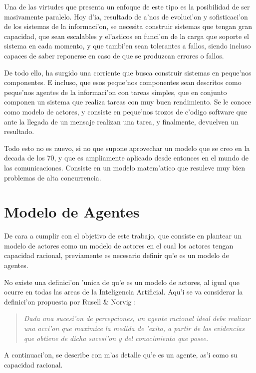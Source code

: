 \documentclass[12pt]{article}
\begin{document}
Una de las virtudes que presenta un enfoque de este tipo es la posibilidad de ser masivamente
paralelo. Hoy d'ia, resultado de a'nos de evoluci'on y sofisticaci'on de los sistemas de la informaci'on,
se necesita construir sistemas que tengan gran capacidad, que sean escalables y el'asticos
en funci'on de la carga que soporte el sistema en cada momento, y que tambi'en sean tolerantes
a fallos, siendo incluso capaces de saber reponerse en caso de que se produzcan errores o fallos.

De todo ello, ha surgido una corriente que busca construir sistemas en peque'nos componentes. E incluso,
que esos peque'nos componentes sean descritos como peque'nos agentes de la informaci'on con tareas simples,
que en conjunto componen un sistema que realiza tareas con muy buen rendimiento. Se le conoce como modelo de
actores, y consiste en peque'nos trozos de c'odigo software que ante la llegada de un mensaje realizan
una tarea, y finalmente, devuelven un resultado.

Todo esto no es nuevo, si no que supone aprovechar un modelo que se creo en la decada de los 70, y
que es ampliamente aplicado desde entonces en el mundo de las comunicaciones. Consiste en un
modelo matem'atico que resuleve muy bien problemas de alta concurrencia.

\section{Modelo de Agentes}
\label{sec:modelo de agentes}
De cara a cumplir con el objetivo de este trabajo, que consiste en plantear
un modelo de actores como un modelo de actores en el cual los actores
tengan capacidad racional, previamente es necesario definir qu'e es un
modelo de agentes.

No existe una definici'on 'unica de qu'e es un modelo de actores, al igual que ocurre en
todas las areas de la Inteligencia Artificial. Aqu'i se va considerar la definici'on
propuesta por Rusell \& Norvig \cite{AI-Russell&Norvig}:

\begin{quote}
\emph{Dada una sucesi'on de percepciones, un agente racional ideal debe realizar
una acci'on que maximice la medida de 'exito, a partir de las evidencias que obtiene
de dicha sucesi'on y del conocimiento que posee.}
\end{quote}

A continuaci'on, se describe con m'as detalle qu'e es un agente, as'i como su capacidad racional.
\end{document}
